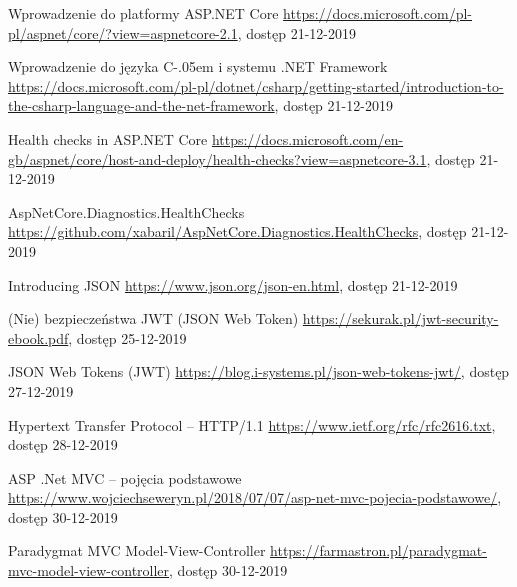 \documentclass[12pt]{article}
\newcommand{\Csharp}{%
  {\settoheight{\dimen0}{C}C\kern-.05em \resizebox{!}{\dimen0}{\raisebox{\depth}{\# }}}}
\numberwithin{figure}{section}
\begin{document}
\begin{sloppypar}
\begin{thebibliography}{99}
    Wprowadzenie do platformy ASP.NET Core
    \url{https://docs.microsoft.com/pl-pl/aspnet/core/?view=aspnetcore-2.1}, dostęp 21-12-2019
    
    Wprowadzenie do języka \Csharp i systemu .NET Framework
    \url{https://docs.microsoft.com/pl-pl/dotnet/csharp/getting-started/introduction-to-the-csharp-language-and-the-net-framework}, dostęp 21-12-2019
    
    Health checks in ASP.NET Core
    \url{https://docs.microsoft.com/en-gb/aspnet/core/host-and-deploy/health-checks?view=aspnetcore-3.1}, dostęp 21-12-2019
    
    AspNetCore.Diagnostics.HealthChecks
    \url{https://github.com/xabaril/AspNetCore.Diagnostics.HealthChecks}, dostęp 21-12-2019
    
    Introducing JSON
    \url{https://www.json.org/json-en.html}, dostęp 21-12-2019
    
    (Nie) bezpieczeństwa JWT (JSON Web Token)
    \url{https://sekurak.pl/jwt-security-ebook.pdf}, dostęp 25-12-2019
    
    JSON Web Tokens (JWT)
    \url{https://blog.i-systems.pl/json-web-tokens-jwt/}, dostęp 27-12-2019
    
    Hypertext Transfer Protocol -- HTTP/1.1
    \url{https://www.ietf.org/rfc/rfc2616.txt}, dostęp 28-12-2019
    
    ASP .Net MVC – pojęcia podstawowe
    \url{https://www.wojciechseweryn.pl/2018/07/07/asp-net-mvc-pojecia-podstawowe/}, dostęp 30-12-2019
    
    Paradygmat MVC Model-View-Controller
    \url{https://farmastron.pl/paradygmat-mvc-model-view-controller}, dostęp 30-12-2019
    
    \end{thebibliography}
\end{sloppypar}
\end{document}

